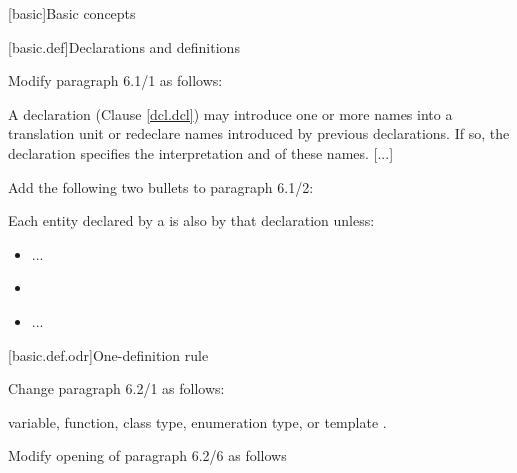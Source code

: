 \setcounter{chapter}{5}
[basic]{Basic concepts}

[basic.def]{Declarations and definitions}

Modify paragraph 6.1/1 as follows:

\begin{std.txt}
  \resetalinea[0]
  \alinea
  A declaration (Clause \ref{dcl.dcl}) may introduce one or more names into a
  translation unit or redeclare names introduced by previous declarations.
  If so, the declaration specifies the interpretation and
   of these names.
  [...]
  \end{std.txt}

\noindent
Add the following two bullets to paragraph 6.1/2:
\begin{std.txt}
  \resetalinea[1]
  \alinea
  Each entity declared by a  is also 
  by that declaration unless:
  \begin{itemize}
    \item ...
    \color{addclr}
    \item {}
    \color{black}
    \item ...
  \end{itemize}
\end{std.txt}


[basic.def.odr]{One-definition rule}

Change paragraph 6.2/1 as follows:
\begin{std.txt}
  \resetalinea[0]
  \alinea
  variable, function, class type, enumeration type, or template
  .
\end{std.txt}

Modify opening of paragraph 6.2/6 as follows

